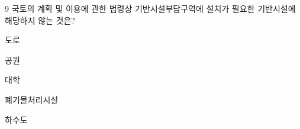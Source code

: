 \begin{question}{9}
국토의 계획 및 이용에 관한 법령상 기반시설부담구역에 설치가 필요한 기반시설에 해당하지 않는 것은?
\begin{choices}
  \item 도로
  \item 공원
  \item 대학
  \item 폐기물처리시설
  \item 하수도
\end{choices}
\end{question}
